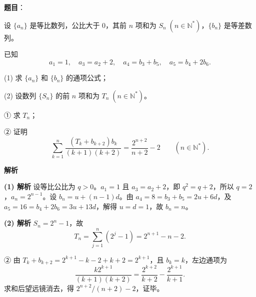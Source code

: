 \begin{answer}

\textbf{题目}：

设 $\{a_n\}$ 是等比数列，公比大于 0，其前 $n$ 项和为 $S_n\;(n\in\mathbb N^*)$，$\{b_n\}$ 是等差数列。

已知
\nopagebreak[4]
\[
a_1=1,\quad a_3=a_2+2,\quad a_4=b_3+b_5,\quad a_5=b_4+2b_6.
\]

(1) 求 $\{a_n\}$ 和 $\{b_n\}$ 的通项公式；

(2) 设数列 $\{S_n\}$ 的前 $n$ 项和为 $T_n\;(n\in\mathbb N^*)$。

① 求 $T_n$；

② 证明
\nopagebreak[4]
\[
\sum_{k=1}^{n}\frac{(T_k+b_{k+2})b_k}{(k+1)(k+2)}=\frac{2^{n+2}}{n+2}-2\qquad(n\in\mathbb N^*).
\]

\textbf{解析}

\textbf{(1) 解析} 设等比公比为 $q>0$。$a_1=1$ 且 $a_3=a_2+2$，即 $q^2=q+2$，所以 $q=2$，$a_n=2^{n-1}$。设 $b_n=u+(n-1)d$。由 $a_4=8=b_3+b_5=2u+6d$，及 $a_5=16=b_4+2b_6=3u+13d$，解得 $u=d=1$，故 $b_n=n$。

\textbf{(2) 解析} $S_n=2^n-1$，故
\nopagebreak[4]
\[T_n=\sum_{j=1}^n(2^j-1)=2^{n+1}-n-2.\]

② 由 $T_k+b_{k+2}=2^{k+1}-k-2+k+2=2^{k+1}$，且 $b_k=k$，左边通项为
\nopagebreak[4]
\[\frac{k2^{k+1}}{(k+1)(k+2)}=\frac{2^{k+2}}{k+2}-\frac{2^{k+1}}{k+1}.\]
求和后望远镜消去，得 $2^{n+2}/(n+2)-2$，证毕。



\end{answer}

